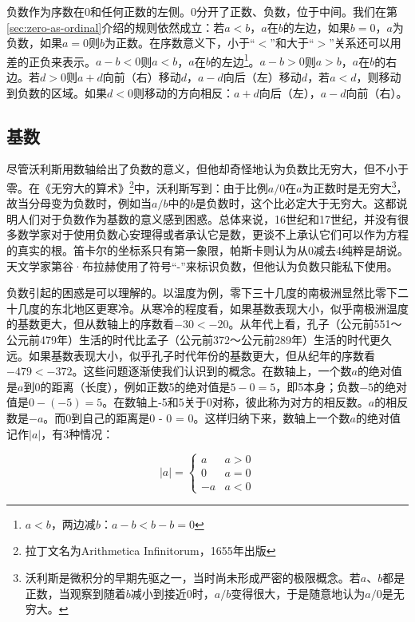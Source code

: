 \documentclass[b5paper]{ctexart}
\begin{document}
负数作为序数在0和任何正数的左侧。0分开了正数、负数，位于中间。我们在第\ref{sec:zero-as-ordinal}介绍的规则依然成立：若$a < b$，$a$在$b$的左边，如果$b = 0$，$a$为负数，如果$a = 0$则$b$为正数。在序数意义下，小于“$<$”和大于“$>$”关系还可以用差的正负来表示。$a - b < 0$则$a < b$，$a$在$b$的左边\footnote{$a < b$，两边减$b$：$a - b < b - b = 0$}。$a - b > 0$则$a > b$，$a$在$b$的右边。若$d > 0$则$a + d$向前（右）移动$d$，$a - d$向后（左）移动$d$，若$a < d$，则移动到负数的区域。如果$d < 0$则移动的方向相反：$a + d$向后（左），$a - d$向前（右）。

\subsection{基数}
尽管沃利斯用数轴给出了负数的意义，但他却奇怪地认为负数比无穷大，但不小于零。在《无穷大的算术》\footnote{拉丁文名为Arithmetica Infinitorum，1655年出版}中，沃利斯写到：由于比例$a/0$在$a$为正数时是无穷大\footnote{沃利斯是微积分的早期先驱之一，当时尚未形成严密的极限概念。若$a$、$b$都是正数，当观察到随着$b$减小到接近0时，$a/b$变得很大，于是随意地认为$a/0$是无穷大。}，故当分母变为负数时，例如当$a/b$中的$b$是负数时，这个比必定大于无穷大\cite{MKlein-1972}。这都说明人们对于负数作为基数的意义感到困惑。总体来说，16世纪和17世纪，并没有很多数学家对于使用负数心安理得或者承认它是数，更谈不上承认它们可以作为方程的真实的根\cite{MKlein-1972}。笛卡尔的坐标系只有第一象限，帕斯卡则认为从0减去4纯粹是胡说。天文学家第谷·布拉赫使用了符号“-”来标识负数，但他认为负数只能私下使用。

负数引起的困惑是可以理解的。以温度为例，零下三十几度的南极洲显然比零下二十几度的东北地区更寒冷。从寒冷的程度看，如果基数表现大小，似乎南极洲温度的基数更大，但从数轴上的序数看$-30 < -20$。从年代上看，孔子（公元前551～公元前479年）生活的时代比孟子（公元前372～公元前289年）生活的时代更久远。如果基数表现大小，似乎孔子时代年份的基数更大，但从纪年的序数看$-479 < -372$。这些问题逐渐使我们认识到的概念。在数轴上，一个数$a$的绝对值是$a$到0的距离（长度），例如正数5的绝对值是$5 - 0 = 5$，即5本身；负数$-5$的绝对值是$0 - (-5) = 5$。在数轴上-5和5关于0对称，彼此称为对方的相反数。$a$的相反数是$-a$。而0到自己的距离是0 - 0 = 0。这样归纳下来，数轴上一个数$a$的绝对值记作$|a|$，有3种情况：

\[
|a| = \begin{cases}
  a & a > 0 \\
  0 & a = 0 \\
  -a & a < 0
\end{cases}
\]
\end{document}
